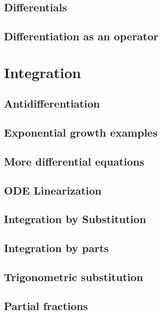 \documentclass[a4paper]{book}
\begin{document}
\begin{sloppypar}
\section{Differentials} \label{ChDifferentiationSecDifferentials}
\section{Differentiation as an operator} \label{ChDifferentiationSecDifferentiationAsAnOperator}

\chapter{Integration} \label{ChIntegration}
\section{Antidifferentiation} \label{ChIntegrationSecAntidifferentiation}
\section{Exponential growth examples} \label{ChIntegrationSecExponentialGrowthExamples}
\section{More differential equations} \label{ChIntegrationSecMoreDifferentialEquations}
\section{ODE Linearization} \label{ChIntegrationSecODELinearization}
\section{Integration by Substitution} \label{ChIntegrationSecIntegrationBySubstitution}
\section{Integration by parts} \label{ChIntegrationSecIntegrationByParts}
\section{Trigonometric substitution} \label{ChIntegrationSecTrigonometricSubstitution}
\section{Partial fractions} \label{ChIntegrationSecPartialFractions}

\end{sloppypar}
\end{document}
